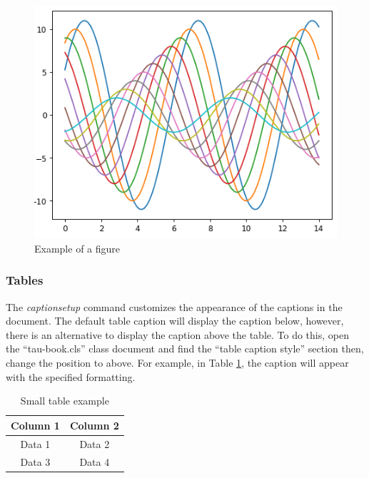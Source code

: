 \documentclass[10pt,a4paper,twoside]{main}
\begin{document}
            \begin{figure}[H]
                \centering
                \includegraphics[width=\columnwidth]{Figures/Lines.png}
                \caption{Example of a figure}
                \label{fig:enter-label}
            \end{figure}

        \subsubsection{Tables}

            The \textit{captionsetup} command customizes the appearance of the captions in the document. The default table caption will display the caption below, however, there is an alternative to display the caption above the table. To do this, open the ``tau-book.cls'' class document and find the ``table caption style'' section then, change the position to above. For example, in Table \ref{tab:example}, the caption will appear with the specified formatting.

            \begin{table}[H]
                \centering
                \begin{tabular}{cc}
                    \textbf{Column 1} & \textbf{Column 2} \\
                    \midrule
                    Data 1 & Data 2 \\
                    Data 3 & Data 4 \\
                    \bottomrule
                \end{tabular}
                \caption{Small table example}
                \label{tab:example}
            \end{table}
\end{document}
